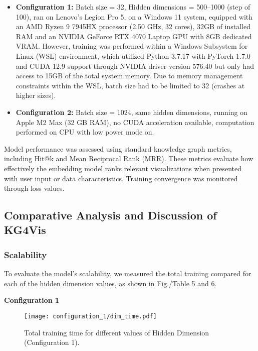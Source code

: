 \begin{itemize}
    \item \textbf{Configuration 1:} Batch size = 32, Hidden dimensions = 500--1000 (step of 100), ran on Lenovo's Legion Pro 5, on a Windows 11 system, equipped with an AMD Ryzen 9 7945HX processor (2.50 GHz, 32 cores), 32GB of installed RAM and an NVIDIA GeForce RTX 4070 Laptop GPU with 8GB dedicated VRAM. However, training was performed within a Windows Subsystem for Linux (WSL) environment, which utilized Python 3.7.17 with PyTorch 1.7.0 and CUDA 12.9 support through NVIDIA driver version 576.40 but only had access to 15GB of the total system memory. Due to memory management constraints within the WSL, batch size had to be limited to 32 (crashes at higher sizes).
    \item \textbf{Configuration 2:} Batch size = 1024, same hidden dimensions, running on Apple M2 Max (32 GB RAM), no CUDA acceleration available, computation performed on CPU with low power mode on.
\end{itemize}

Model performance was assessed using standard knowledge graph metrics, including Hit@k and Mean Reciprocal Rank (MRR). These metrics evaluate how effectively the embedding model ranks relevant visualizations when presented with user input or data characteristics. Training convergence was monitored through loss values.

\subsection{Comparative Analysis and Discussion of KG4Vis}

\subsubsection{Scalability}
To evaluate the model's scalability, we measured the total training compared for each of the hidden dimension values, as shown in Fig./Table 5 and 6.

\vspace{4.0cm}
\textbf{Configuration 1}

\begin{figure}[H]
    \centering
    \texttt{[image: configuration\_1/dim\_time.pdf]}
    \caption{Total training time for different values of Hidden Dimension (Configuration 1).}  
    \label{fig:time_hidden_dim_evolution_c1}               
\end{figure}


